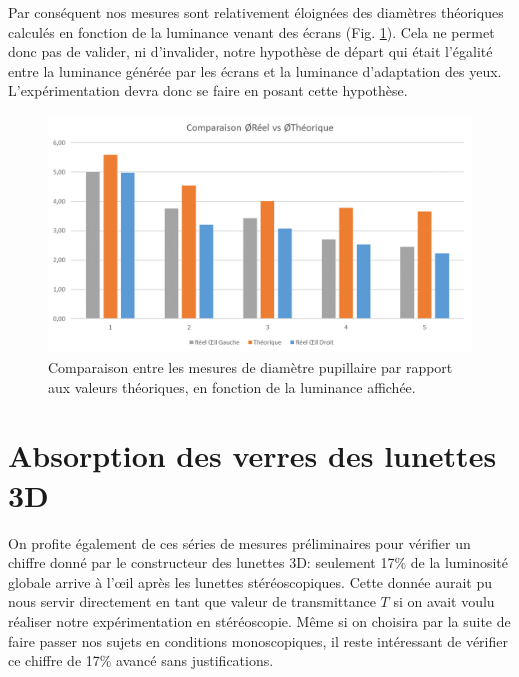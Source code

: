 	\par Par conséquent nos mesures sont relativement éloignées des diamètres théoriques calculés en fonction de la luminance venant des écrans (Fig. \ref{fig:resultats_mesure_pupille}). Cela ne permet donc pas de valider, ni d'invalider, notre hypothèse de départ qui était l'égalité entre la luminance générée par les écrans et la luminance d'adaptation des yeux. L'expérimentation devra donc se faire en posant cette hypothèse.
	
	\begin{figure}
		\centering
		\includegraphics[scale=.75]{Figures/ComparaisonDiamReelDiamTheo}
		\caption{Comparaison entre les mesures de diamètre pupillaire par rapport aux valeurs théoriques, en fonction de la luminance affichée.}
		\label{fig:resultats_mesure_pupille}
	\end{figure}
	
	\section{Absorption des verres des lunettes 3D}
	\par On profite également de ces séries de mesures préliminaires pour vérifier un chiffre donné par le constructeur des lunettes 3D: seulement 17\% de la luminosité globale arrive à l'œil après les lunettes stéréoscopiques. Cette donnée aurait pu nous servir directement en tant que valeur de transmittance $T$ si on avait voulu réaliser notre expérimentation en stéréoscopie. Même si on choisira par la suite de faire passer nos sujets en conditions monoscopiques, il reste intéressant de vérifier ce chiffre de 17\% avancé sans justifications.
	
